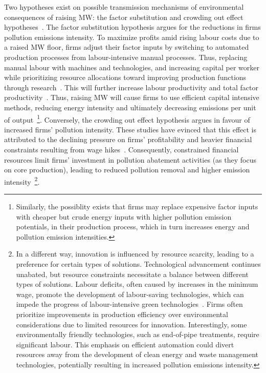 \documentclass[12pt, english]{article}
\begin{document}
    Two hypotheses exist on possible transmission mechanisms of environmental consequences of raising MW: the factor substitution and crowding out effect hypotheses~\parencite{zhang2023unintended}. The factor substitution hypothesis argues for the reductions in firms pollution emissions intensity. To maximize profits amid rising labour costs due to a raised MW floor, firms adjust their factor inputs by switching to automated production processes from labour-intensive manual processes. Thus, replacing manual labour with machines and technologies, and increasing capital per worker while prioritizing resource allocations toward improving production functions through research~\parencite{harasztosi2019pays,hau2020firm, geng2022minimum,dai2023minimum, li2020labor}. This will further increase labour productivity and total factor productivity~\parencite{riley2017raising}. Thus, raising MW will cause firms to use efficient capital intensive methods, reducing energy intensity and ultimately decreasing emissions per unit of output~\footnote{\tiny Similarly, the possiblity exists that firms may replace expensive factor inputs with cheaper but crude energy inputs with higher pollution emission potentials, in their production process, which in turn increases energy and pollution emission intensities.}. Conversely, the crowding out effect hypothesis argues in favour of increased firms' pollution intensity. These studies have evinced that this effect is attributed to the declining pressure on firms' profitability and heavier financial constraints resulting from wage hikes~\parencite{draca2011minimum, bell2018minimum, du2022minimum}. Consequently, constrained financial resources limit firms' investment in pollution abatement activities (as they focus on core production), leading to reduced pollution removal and higher emission intensity~\footnote{\tiny In a different way, innovation is influenced by resource scarcity, leading to a preference for certain types of solutions. Technological advancement continues unabated, but resource constraints necessitate a balance between different types of solutions. Labour deficits, often caused by increases in the minimum wage, promote the development of labour-saving technologies, which can impede the progress of labour-intensive green technologies~\parencite{acemoglu2010does}. Firms often prioritize improvements in production efficiency over environmental considerations due to limited resources for innovation. Interestingly, some environmentally friendly technologies, such as end-of-pipe treatments, require significant labour. This emphasis on efficient automation could divert resources away from the development of clean energy and waste management technologies, potentially resulting in increased pollution emissions intensity.}.
\end{document}
